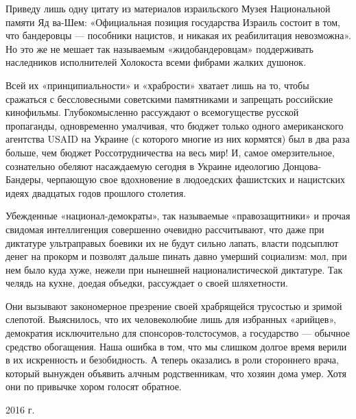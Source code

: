 Приведу лишь одну цитату из материалов израильского Музея Национальной памяти
Яд ва-Шем: «Официальная позиция государства Израиль состоит в том, что
бандеровцы — пособники нацистов, и никакая их реабилитация невозможна». Но это
же не мешает так называемым «жидобандеровцам» поддерживать наследников
исполнителей Холокоста всеми фибрами жалких душонок. 

Всей их «принципиальности» и «храбрости» хватает лишь на то, чтобы сражаться с
бессловесными советскими памятниками и запрещать российские кинофильмы.
Глубокомысленно рассуждают о всемогуществе русской пропаганды, одновременно
умалчивая, что бюджет только одного американского агентства USAID на Украине (с
которого многие из них кормятся) был в два раза больше, чем бюджет
Россотрудничества на весь мир! И, самое омерзительное, сознательно обеляют
насаждаемую сегодня в Украине идеологию Донцова-Бандеры, черпающую свое
вдохновение в людоедских фашистских и нацистских идеях двадцатых годов прошлого
столетия.

Убежденные «национал-демократы», так называемые «правозащитники» и прочая
свидомая интеллигенция совершенно очевидно рассчитывают, что даже при диктатуре
ультраправых боевики их не будут сильно лапать, власти подсыплют денег на
прокорм и позволят дальше пинать давно умерший социализм: мол, при нем было
куда хуже, нежели при нынешней националистической диктатуре. Так челядь на
кухне, доедая объедки, рассуждает о своей шляхетности.

Они вызывают закономерное презрение своей храбрящейся трусостью и зримой
слепотой. Выяснилось, что их человеколюбие лишь для избранных «арийцев»,
демократия исключительно для спонсоров-толстосумов, а государство — обычное
средство обогащения. Наша ошибка в том, что мы слишком долгое время верили в их
искренность и безобидность. А теперь оказались в роли стороннего врача, который
вынужден объявить алчным родственникам, что хозяин дома умер. Хотя они по
привычке хором голосят обратное.

2016 г.

